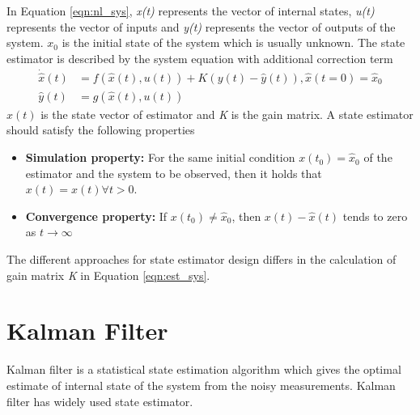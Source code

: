 In Equation \ref{eqn:nl_sys}, \emph{x(t)} represents the vector of internal states, \emph{u(t)} represents the vector of inputs and \emph{y(t)} represents the vector of outputs of the system. $x_0$ is the initial state of the system which is usually unknown. 
The state estimator is described by the system equation with additional correction term
\begin{equation}
\begin{split}
\label{eqn:est_sys}
\dot{\hat{x}}(t) &= f(\hat{x}(t),u(t)) + K(y(t)-\hat{y}(t)) , \hat{x}(t=0) = \hat{x}_0\\
\hat{y}(t) &= g(\hat{x}(t),u(t))
\end{split}
\end{equation}
$\hat{x}(t)$ is the state vector of estimator and \emph{K} is the gain matrix.  A state estimator should satisfy the following properties
\begin{itemize}
\item \textbf{Simulation property:} For the same initial condition $x(t_0) = \hat{x}_0$ of the estimator and the system to be observed, then it holds that $x(t) = \hat{x}(t) \forall t > 0 $.
\item \textbf{Convergence property:} If $x(t_0) \neq \hat{x}_0$, then $x(t) - \hat{x}(t)$ tends to zero as $ t \rightarrow \infty $
\end{itemize}

The different approaches for state estimator design differs in the calculation of gain matrix \emph{K} in Equation \ref{eqn:est_sys}.

\section{Kalman Filter}
Kalman filter is a statistical state estimation algorithm which gives the optimal estimate of internal state of the system from the noisy measurements. Kalman filter has widely used state estimator.